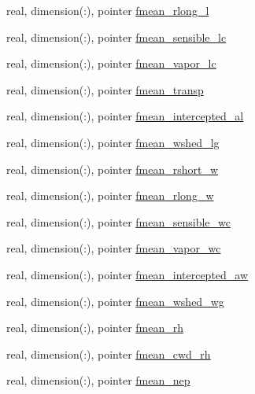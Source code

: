 \begin{DoxyCompactItemize}
\item 
real, dimension(\+:), pointer \hyperlink{structed__state__vars_1_1edtype_af679da04ddebc99dfabec53701706d74}{fmean\+\_\+rlong\+\_\+l}
\item 
real, dimension(\+:), pointer \hyperlink{structed__state__vars_1_1edtype_a0decc5c5faf994909b55b7d1650024d9}{fmean\+\_\+sensible\+\_\+lc}
\item 
real, dimension(\+:), pointer \hyperlink{structed__state__vars_1_1edtype_a69b0178c19aa4aa24c306b1726d58b7f}{fmean\+\_\+vapor\+\_\+lc}
\item 
real, dimension(\+:), pointer \hyperlink{structed__state__vars_1_1edtype_a39c06e782c6bf1bcf24b4bfff4ced244}{fmean\+\_\+transp}
\item 
real, dimension(\+:), pointer \hyperlink{structed__state__vars_1_1edtype_ae1f8219c1b255468e90a238084f37066}{fmean\+\_\+intercepted\+\_\+al}
\item 
real, dimension(\+:), pointer \hyperlink{structed__state__vars_1_1edtype_a948594db67b83503cf914a2ff51cb110}{fmean\+\_\+wshed\+\_\+lg}
\item 
real, dimension(\+:), pointer \hyperlink{structed__state__vars_1_1edtype_a191944c2246160e7133d8bba3a521dad}{fmean\+\_\+rshort\+\_\+w}
\item 
real, dimension(\+:), pointer \hyperlink{structed__state__vars_1_1edtype_a84aaeae4d6d02618686c9181c05dbbeb}{fmean\+\_\+rlong\+\_\+w}
\item 
real, dimension(\+:), pointer \hyperlink{structed__state__vars_1_1edtype_ac00312f66f034563b85f0e4341548869}{fmean\+\_\+sensible\+\_\+wc}
\item 
real, dimension(\+:), pointer \hyperlink{structed__state__vars_1_1edtype_ab8c840b77b8d93fae8bcec1acad175a6}{fmean\+\_\+vapor\+\_\+wc}
\item 
real, dimension(\+:), pointer \hyperlink{structed__state__vars_1_1edtype_ac0e3b9b703450dabc1d9b9e8ac7efc7c}{fmean\+\_\+intercepted\+\_\+aw}
\item 
real, dimension(\+:), pointer \hyperlink{structed__state__vars_1_1edtype_ab1785afb896816409918217141cea532}{fmean\+\_\+wshed\+\_\+wg}
\item 
real, dimension(\+:), pointer \hyperlink{structed__state__vars_1_1edtype_af58a739971439c227f9eb54b4c469189}{fmean\+\_\+rh}
\item 
real, dimension(\+:), pointer \hyperlink{structed__state__vars_1_1edtype_a3f608b23673cd1bfe9f32f0e8b3a0103}{fmean\+\_\+cwd\+\_\+rh}
\item 
real, dimension(\+:), pointer \hyperlink{structed__state__vars_1_1edtype_a8dbd6b0c579576e6ac7ead6d4e31873e}{fmean\+\_\+nep}

\end{DoxyCompactItemize}
